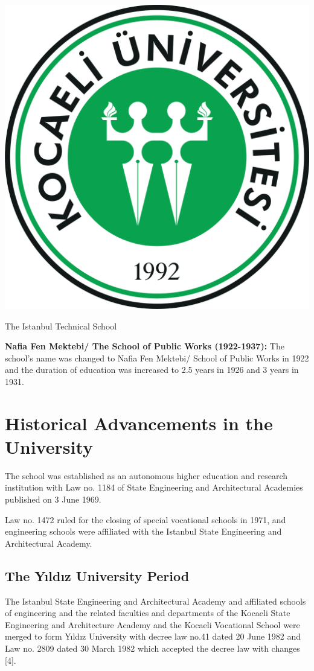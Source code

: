\begin{map}[!htbp]
\centering
\includegraphics[width=\textwidth]{thesisChapters/images/Picture2}
\caption{The Istanbul Technical School}
\end{map}

\textbf{Nafia Fen Mektebi/ The School of Public Works (1922-1937):}  The school’s name was changed to Nafia Fen Mektebi/ School of Public Works in 1922 and the duration of education was increased to 2.5 years in 1926 and 3 years in 1931.

\section{Historical Advancements in the University}

The school was established as an autonomous higher education and research institution with Law no. 1184 of State Engineering and Architectural Academies published on 3 June 1969. 

Law no. 1472 ruled for the closing of special vocational schools in 1971, and engineering schools were affiliated with the Istanbul State Engineering and Architectural Academy.

\subsection{The Yıldız University Period}
The Istanbul State Engineering and Architectural Academy and affiliated schools of engineering and the related faculties and departments of the Kocaeli State Engineering and Architecture Academy and the Kocaeli Vocational School were merged to form Yıldız University with decree law no.41 dated 20 June 1982 and Law no. 2809 dated 30 March 1982 which accepted the decree law with changes [4].

